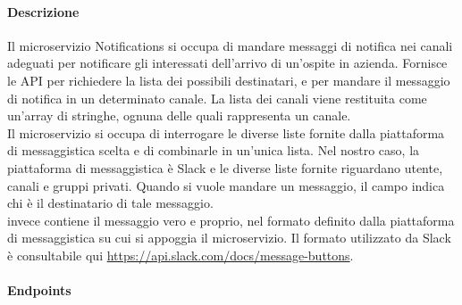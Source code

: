 \paragraph{Descrizione}
Il microservizio Notifications si occupa di mandare messaggi di notifica nei canali adeguati per notificare gli interessati dell'arrivo di un'ospite in azienda. Fornisce le API per richiedere la lista dei possibili destinatari, e per mandare il messaggio di notifica in un determinato canale. La lista dei canali viene restituita come un'array di stringhe, ognuna delle quali rappresenta un canale.\\
Il microservizio si occupa di interrogare le diverse liste fornite dalla piattaforma di messaggistica scelta e di combinarle in un'unica lista. Nel nostro caso, la piattaforma di messaggistica è Slack e le diverse liste fornite riguardano utente, canali e gruppi privati. Quando si vuole mandare un messaggio, il campo  indica chi è il destinatario di tale messaggio.\\  invece contiene il messaggio vero e proprio, nel formato definito dalla piattaforma di messaggistica su cui si appoggia il microservizio. Il formato utilizzato da Slack è consultabile qui \url{https://api.slack.com/docs/message-buttons}.
\paragraph{Endpoints}

